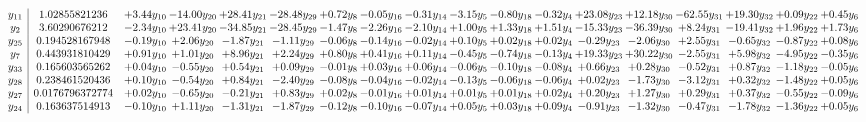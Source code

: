 \documentclass[9pt]{article}
\begin{document}
\[\begin{array}{c| c c@{\hskip 2pt} c@{\hskip 2pt} c@{\hskip 2pt} c@{\hskip 2pt} c@{\hskip 2pt} c@{\hskip 2pt} c@{\hskip 2pt} c@{\hskip 2pt} c@{\hskip 2pt} c@{\hskip 2pt} c@{\hskip 2pt} c@{\hskip 2pt} c@{\hskip 2pt} c@{\hskip 2pt} c@{\hskip 2pt} c@{\hskip 2pt} }
 y_{11}   &  1.02855821236 & +  3.44 y_{10} & -14.00 y_{20} & + 28.41 y_{21} & -28.48 y_{29} & +  0.72 y_{8} & -0.05 y_{16} & -0.31 y_{14} & -3.15 y_{5} & -0.80 y_{18} & -0.32 y_{4} & + 23.08 y_{23} & + 12.18 y_{30} & -62.55 y_{31} & + 19.30 y_{32} & +  0.09 y_{22} & +  0.45 y_{6}\\
 y_{2}   &  3.60290676212 & -2.34 y_{10} & + 23.41 y_{20} & -34.85 y_{21} & -28.45 y_{29} & -1.47 y_{8} & -2.26 y_{16} & -2.10 y_{14} & +  1.00 y_{5} & +  1.33 y_{18} & +  1.51 y_{4} & -15.33 y_{23} & -36.39 y_{30} & +  8.24 y_{31} & -19.41 y_{32} & +  1.96 y_{22} & +  1.73 y_{6}\\
 y_{25}   &  0.194528167948 & -0.19 y_{10} & +  2.06 y_{20} & -1.87 y_{21} & -1.11 y_{29} & -0.06 y_{8} & -0.14 y_{16} & -0.02 y_{14} & +  0.10 y_{5} & +  0.02 y_{18} & +  0.02 y_{4} & -0.29 y_{23} & -2.06 y_{30} & +  2.55 y_{31} & -0.65 y_{32} & -0.87 y_{22} & +  0.08 y_{6}\\
 y_{7}   &  0.443931810429 & +  0.91 y_{10} & +  1.01 y_{20} & +  8.96 y_{21} & +  2.24 y_{29} & +  0.80 y_{8} & +  0.41 y_{16} & +  0.11 y_{14} & -0.45 y_{5} & -0.74 y_{18} & -0.13 y_{4} & + 19.33 y_{23} & + 30.22 y_{30} & -2.55 y_{31} & +  5.98 y_{32} & -4.95 y_{22} & -0.35 y_{6}\\
 y_{33}   &  0.165603565262 & +  0.04 y_{10} & -0.55 y_{20} & +  0.54 y_{21} & +  0.09 y_{29} & -0.01 y_{8} & +  0.03 y_{16} & +  0.06 y_{14} & -0.06 y_{5} & -0.10 y_{18} & -0.08 y_{4} & +  0.66 y_{23} & +  0.28 y_{30} & -0.52 y_{31} & +  0.87 y_{32} & -1.18 y_{22} & -0.05 y_{6}\\
 y_{28}   &  0.238461520436 & +  0.10 y_{10} & -0.54 y_{20} & +  0.84 y_{21} & -2.40 y_{29} & -0.08 y_{8} & -0.04 y_{16} & -0.02 y_{14} & -0.13 y_{5} & -0.06 y_{18} & -0.06 y_{4} & +  0.02 y_{23} & -1.73 y_{30} & -3.12 y_{31} & +  0.32 y_{32} & -1.48 y_{22} & +  0.05 y_{6}\\
 y_{27}   &  0.0176796372774 & +  0.02 y_{10} & -0.65 y_{20} & -0.21 y_{21} & +  0.83 y_{29} & +  0.02 y_{8} & -0.01 y_{16} & +  0.01 y_{14} & +  0.01 y_{5} & +  0.01 y_{18} & +  0.02 y_{4} & +  0.20 y_{23} & +  1.27 y_{30} & +  0.29 y_{31} & +  0.37 y_{32} & -0.55 y_{22} & -0.09 y_{6}\\
 y_{24}   &  0.163637514913 & -0.10 y_{10} & +  1.11 y_{20} & -1.31 y_{21} & -1.87 y_{29} & -0.12 y_{8} & -0.10 y_{16} & -0.07 y_{14} & +  0.05 y_{5} & +  0.03 y_{18} & +  0.09 y_{4} & -0.91 y_{23} & -1.32 y_{30} & -0.47 y_{31} & -1.78 y_{32} & -1.36 y_{22} & +  0.05 y_{6}\\

\end{array}\]
\end{document}
